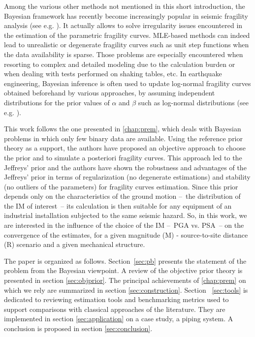Among the various other methods not mentioned in this short introduction, the Bayesian framework has recently become increasingly popular in seismic fragility analysis (see e.g. \cite{gardoni_probabilistic_2002,wang_seismic_2018,katayama_bayesian-estimation-based_2021,koutsourelakis_assessing_2010,damblin_approche_2014,tadinada_structural_2017,kwag_computationally_2018,jeon_parameterized_2019,tabandeh_physics-based_2020}). 
It actually allows to solve irregularity issues encountered in the estimation of the parametric fragility curves. MLE-based methods can indeed lead to unrealistic or degenerate fragility curves such as unit step functions when the data availability is sparse. Those problems are especially encountered when resorting to complex and detailed modeling due to the calculation burden or when dealing with tests performed on shaking tables, etc. In earthquake engineering, Bayesian inference is often used to update log-normal fragility curves obtained beforehand by various approaches, by assuming independent distributions for the prior values of $\alpha$ and $\beta$ such as log-normal distributions (see e.g. \cite{tadinada_structural_2017,kwag_computationally_2018,wang_seismic_2018,katayama_bayesian-estimation-based_2021,straub_improved_2008}).

This work follows the one presented in \cref{chap:prem}, which deals with Bayesian problems in which only few binary data are available. Using the reference prior theory as a support, the authors have proposed an objective approach to choose the prior and to simulate a posteriori fragility curves. This approach led to the Jeffreys' prior and the authors have shown the robustness and advantages of the Jeffreys' prior in terms of regularization (no degenerate estimations) and stability (no outliers of the parameters) for fragility curves estimation. Since this prior depends only on the characteristics of the ground motion --~the distribution of the IM of interest~-- its calculation is then suitable for any equipment of an industrial installation subjected to the same seismic hazard. So, in this work, we are interested in the influence of the choice of the IM --~PGA vs. PSA~-- on the convergence of the estimates, for a given magnitude (M) - source-to-site distance (R) scenario and a given mechanical structure.

The paper is organized as follows. Section~\ref{sec:pb} presents the statement of the problem from the Bayesian viewpoint. A review of the objective prior theory is presented in section \ref{sec:objprior}. The principal achievements of \cref{chap:prem} on which we rely are summarized in section \ref{sec:construction}. Section ~\ref{sec:tools} is dedicated to reviewing estimation tools and benchmarking metrics used to support comparisons with classical approaches of the literature. They are implemented in section \ref{sec:application} on a case study, a piping system. A conclusion is proposed in section \ref{sec:conclusion}.





